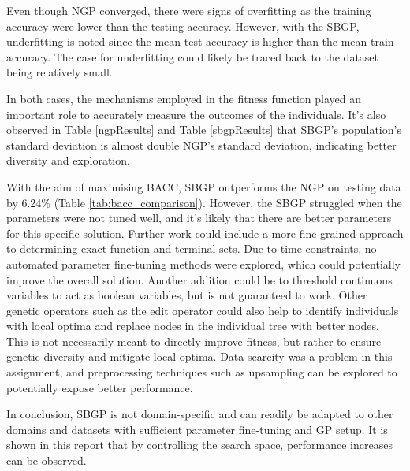 \documentclass{article}
\begin{document}
Even though NGP converged, there were signs of overfitting as the training accuracy were lower than the testing accuracy. However, with the SBGP, underfitting is noted since the mean test accuracy is higher than the mean train accuracy. The case for underfitting could likely be traced back to the dataset being relatively small.

In both cases, the mechanisms employed in the fitness function played an important role to accurately measure the outcomes of the individuals. It's also observed in Table \ref{ngpResults} and Table \ref{sbgpResults} that SBGP's population's standard deviation is almost double NGP's standard deviation, indicating better diversity and exploration.

With the aim of maximising BACC, SBGP outperforms the NGP on testing data by 6.24\% (Table \ref{tab:bacc_comparison}). However, the SBGP struggled when the parameters were not tuned well, and it's likely that there are better parameters for this specific solution. Further work could include a more fine-grained approach to determining exact function and terminal sets. Due to time constraints, no automated parameter fine-tuning methods were explored, which could potentially improve the overall solution. Another addition could be to threshold continuous variables to act as boolean variables, but is not guaranteed to work. Other genetic operators such as the edit operator could also help to identify individuals with local optima and replace nodes in the individual tree with better nodes. This is not necessarily meant to directly improve fitness, but rather to ensure genetic diversity and mitigate local optima. Data scarcity was a problem in this assignment, and preprocessing techniques such as upsampling can be explored to potentially expose better performance.

In conclusion, SBGP is not domain-specific and can readily be adapted to other domains and datasets with sufficient parameter fine-tuning and GP setup. It is shown in this report that by controlling the search space, performance increases can be observed.



\end{document}
